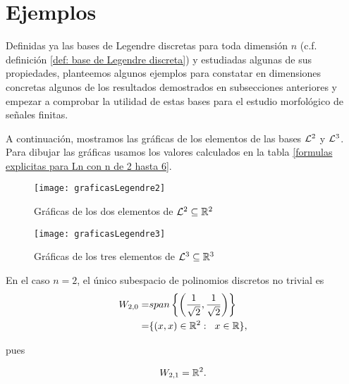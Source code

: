 \section{Ejemplos}
\label{sec: ejemplos}
Definidas ya las bases de Legendre discretas
para toda dimensión $n$ 
(c.f. definición  
\ref{def: base de Legendre discreta}) y estudiadas algunas de sus 
propiedades, planteemos algunos ejemplos
para constatar en dimensiones concretas algunos de los
resultados demostrados en subsecciones anteriores
y empezar a comprobar la utilidad de estas bases para el 
estudio morfológico de señales finitas.


\begin{ej}
A continuación, mostramos las gráficas de los
elementos de las bases $\mathcal{L}^{2}$ y $\mathcal{L}^{3}$.
Para dibujar las gráficas usamos los valores
calculados en la tabla
\ref{formulas explicitas para Ln con n de 2 hasta 6}.


\begin{figure}[H]
\centering\captionsetup{format = hang}
	\begin{measuredfigure}
		\texttt{[image: graficasLegendre2]} 
		\caption{Gráficas de los dos elementos de $\mathcal{L}^{2}
		\subseteq \mathbb{R}^{2}$}
 	\end{measuredfigure}
 \end{figure}



\begin{figure}[H]
\centering\captionsetup{format = hang}
	\begin{measuredfigure}
		\texttt{[image: graficasLegendre3]} 
		\caption{Gráficas de los tres elementos de $\mathcal{L}^{3}
		\subseteq \mathbb{R}^{3}$}
 	\end{measuredfigure}
 \end{figure}



En el caso $n=2$, el único subespacio de polinomios
discretos no trivial es 
\begin{align*}
W_{2,0}= & span \left\{ 
\left(\frac{1}{\sqrt2}, \frac{1}{\sqrt2} \right) \right\} \\
= & \{ (x,x) \in \mathbb{R}^{2}: \hspace{0.2cm} x \in \mathbb{R} \},
\end{align*}

pues

\begin{equation}
\label{eq1: 1Dic}
W_{2,1}= \mathbb{R}^{2}.
\end{equation}



\end{ej}
